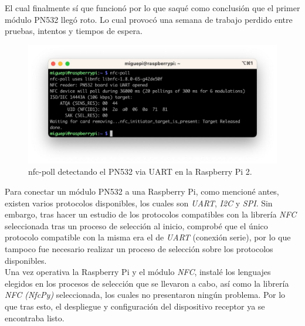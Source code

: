 El cual finalmente sí que funcionó por lo que saqué como conclusión que el primer
módulo PN532 llegó roto. Lo cual provocó una semana de trabajo perdido entre
pruebas, intentos y tiempos de espera.

\begin{figure}[htb]
    \centering
    \includegraphics[width=\textwidth]{fotos/nfc_poll.jpeg}
    \caption{nfc-poll detectando el PN532 via UART en la Raspberry Pi 2.}
\end{figure}

Para conectar un módulo PN532 a una Raspberry Pi, como mencioné antes, existen
varios protocolos disponibles, los cuales son \emph{UART}, \emph{I2C} y
\emph{SPI}. Sin embargo, tras hacer un estudio de los protocolos compatibles con
la librería \emph{NFC} seleccionada tras un proceso de selección al inicio,
comprobé que el único protocolo compatible con la misma era el de \emph{UART}
(conexión serie), por lo que tampoco fue necesario realizar un proceso de
selección sobre los protocolos disponibles.\\

Una vez operativa la Raspberry Pi y el módulo \emph{NFC}, instalé los lenguajes
elegidos en los procesos de selección que se llevaron a cabo, así como la
librería \emph{NFC (NfcPy)} seleccionada, los cuales no presentaron ningún
problema. Por lo que tras esto, el despliegue y configuración del dispositivo
receptor ya se encontraba listo.